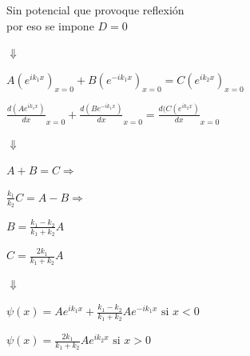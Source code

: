 \documentclass[oneside]{book}
\numberwithin{equation}{section}
\numberwithin{figure}{section}
\numberwithin{table}{section}
\begin{document}
				\begin{minipage}[t]{0.5\textwidth}
					\begin{center}
						Sin potencial que provoque reflexión\\
						por eso se impone $D=0$
					\end{center}
					\begin{center}
						$\Downarrow$
					\end{center}
					\begin{center}
						$\displaystyle A(e^{ik_1x})_{x=0}+B(e^{-ik_1x})_{x=0}=C(e^{ik_2x})_{x=0}$
					\end{center}
					\begin{center}
						$\displaystyle \frac{d(Ae^{ik_1x})}{dx}_{x=0}+\frac{d(Be^{-ik_1x})}{dx}_{x=0}=\frac{d(C(e^{ik_2x})}{dx}_{x=0}$
					\end{center}
					\begin{center}
						$\Downarrow$
					\end{center}
					\begin{center}
						\begin{minipage}[t]{0.3\textwidth}
							\begin{center}
								$A+B=C \Rightarrow$
							\end{center}
							\begin{center}
								$\displaystyle \frac{k_1}{k_2}C=A-B \Rightarrow$
							\end{center}					
						\end{minipage}	
						\begin{minipage}[t]{0.3\textwidth}
							\begin{center}
								$\displaystyle B=\frac{k_1-k_2}{k_1+k_2}A$
							\end{center}
							\begin{center}
								$\displaystyle C=\frac{2k_1}{k_1+k_2}A$
							\end{center}
						\end{minipage}	
					\end{center}				
					\begin{center}
						$\Downarrow$
					\end{center}
					\begin{center}
						$\displaystyle \psi(x)=Ae^{ik_1x}+\frac{k_1-k_2}{k_1+k_2}Ae^{-ik_1x} \text{ si } x<0$
					\end{center}
					\begin{center}
						$\displaystyle \psi(x)=\frac{2k_1}{k_1+k_2}Ae^{ik_2x} \text{ si } x>0$
					\end{center}

\end{minipage}
\end{document}
